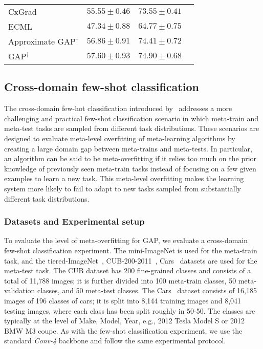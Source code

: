 \begin{table}[t!]
{\begin{tabular}{lccc}
    CxGrad~\cite{lee2022contextual}             & \quad \; $55.55 \pm 0.46$                     & \quad \; $73.55 \pm 0.41$\\
    ECML~\cite{hiller2022enforcing}             & \quad \; $47.34 \pm 0.88$                     & \quad \; $64.77 \pm 0.75$\\
    \midrule
   Approximate GAP$^{\dagger}$                                & \quad \; $56.86 \pm 0.91$                     & \quad \; $74.41 \pm 0.72$\\
   GAP$^{\dagger}$                                      & \quad \; $\mathbf{57.60} \pm \mathbf{0.93}$   & \quad \; $\mathbf{74.90} \pm \mathbf{0.68}$\\
    \bottomrule
  \end{tabular}}
  \label{tab:tiered-ImageNet}
\end{table}

\subsection{Cross-domain few-shot classification}
The cross-domain few-hot classification introduced by~\cite{chen2019closer} addresses a more challenging and practical few-shot classification scenario in which meta-train and meta-test tasks are sampled from different task distributions. These scenarios are designed to evaluate meta-level overfitting of meta-learning algorithms by creating a large domain gap between meta-trains and meta-tests. In particular, an algorithm can be said to be meta-overfitting if it relies too much on the prior knowledge of previously seen meta-train tasks instead of focusing on a few given examples to learn a new task. This meta-level overfitting makes the learning system more likely to fail to adapt to new tasks sampled from substantially different task distributions.

\subsubsection{Datasets and Experimental setup}
To evaluate the level of meta-overfitting for GAP, we evaluate a cross-domain few-shot classification experiment.
The mini-ImageNet is used for the meta-train task, and the tiered-ImageNet~\cite{ren2018meta}, CUB-200-2011~\cite{wah2011caltech}, Cars~\cite{bertinetto2018meta} datasets are used for the meta-test task. The CUB dataset has 200 fine-grained classes and consists of a total of 11,788 images; it is further divided into 100 meta-train classes, 50 meta-validation classes, and 50 meta-test classes. 
The Cars~\cite{krause20133d} dataset consists of 16,185 images of 196 classes of cars; it is split into 8,144 training images and 8,041 testing images, where each class has been split roughly in 50-50. The classes are typically at the level of Make, Model, Year, e.g., 2012 Tesla Model S or 2012 BMW M3 coupe.
As with the few-shot classification experiment, we use the standard \textit{Conv-4} backbone and follow the same experimental protocol.

